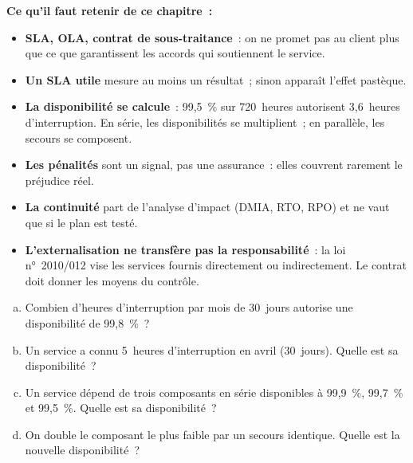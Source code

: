 \begin{boxresume}
\textbf{Ce qu'il faut retenir de ce chapitre~:}
\begin{itemize}
    \item \textbf{SLA, OLA, contrat de sous-traitance}~: on ne promet pas au
          client plus que ce que garantissent les accords qui soutiennent le
          service.
    \item \textbf{Un SLA utile} mesure au moins un résultat~; sinon
          apparaît l'effet pastèque.
    \item \textbf{La disponibilité se calcule}~: 99,5~\% sur 720~heures
          autorisent 3,6~heures d'interruption. En série, les
          disponibilités se multiplient~; en parallèle, les secours se
          composent.
    \item \textbf{Les pénalités} sont un signal, pas une assurance~: elles
          couvrent rarement le préjudice réel.
    \item \textbf{La continuité} part de l'analyse d'impact (DMIA, RTO,
          RPO) et ne vaut que si le plan est testé.
    \item \textbf{L'externalisation ne transfère pas la responsabilité}~:
          la loi n°~2010/012 vise les services fournis directement ou
          indirectement. Le contrat doit donner les moyens du contrôle.
\end{itemize}
\end{boxresume}

\bigskip

\begin{boxexo}[title={\ding{45}\quad Exercice~15.1. Calculs de disponibilité \niveaubase}]
\begin{enumerate}[(a)]
    \item Combien d'heures d'interruption par mois de 30~jours autorise une
          disponibilité de 99,8~\%~?
    \item Un service a connu 5~heures d'interruption en avril (30~jours).
          Quelle est sa disponibilité~?
    \item Un service dépend de trois composants en série disponibles à
          99,9~\%, 99,7~\% et 99,5~\%. Quelle est sa disponibilité~?
    \item On double le composant le plus faible par un secours identique.
          Quelle est la nouvelle disponibilité~?
\end{enumerate}
\end{boxexo}

